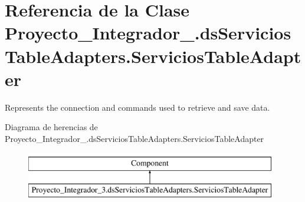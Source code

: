 \hypertarget{class_proyecto___integrador__3_1_1ds_servicios_table_adapters_1_1_servicios_table_adapter}{\section{Referencia de la Clase Proyecto\-\_\-\-Integrador\-\_.\-ds\-Servicios\-Table\-Adapters.\-Servicios\-Table\-Adapter}
\label{class_proyecto___integrador__3_1_1ds_servicios_table_adapters_1_1_servicios_table_adapter}
}


Represents the connection and commands used to retrieve and save data.  


Diagrama de herencias de Proyecto\-\_\-\-Integrador\-\_.\-ds\-Servicios\-Table\-Adapters.\-Servicios\-Table\-Adapter\begin{figure}[H]
\begin{center}
\leavevmode
\includegraphics[height=2.000000cm]{d4/d3f/class_proyecto___integrador__3_1_1ds_servicios_table_adapters_1_1_servicios_table_adapter}
\end{center}
\end{figure}

